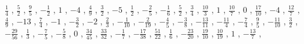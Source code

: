 \documentclass[12pt,fleqn]{article}
\theoremstyle{aufg}
\theoremstyle{bsp}
\begin{document}
\begin{flushleft}
$ \scriptstyle\frac{1}{4}$ , $ \scriptstyle\frac{5}{2}$ , $ \scriptstyle\frac{9}{5}$ , $ \scriptstyle- \frac{1}{2}$ , $ \scriptstyle1$ , $ \scriptstyle-4$ , $ \scriptstyle\frac{4}{9}$ , $ \scriptstyle\frac{3}{2}$ , $ \scriptstyle-5$ , $ \scriptstyle\frac{1}{2}$ , $ \scriptstyle- \frac{2}{5}$ , $ \scriptstyle- \frac{1}{6}$ , $ \scriptstyle\frac{5}{2}$ , $ \scriptstyle\frac{3}{4}$ , $ \scriptstyle\frac{10}{3}$ , $ \scriptstyle1$ , $ \scriptstyle\frac{10}{7}$ , $ \scriptstyle0$ , $ \scriptstyle\frac{17}{10}$ , $ \scriptstyle-4$ , $ \scriptstyle\frac{12}{7}$ , $ \scriptstyle\frac{4}{9}$ , $ \scriptstyle-13$ , $ \scriptstyle\frac{7}{4}$ , $ \scriptstyle-1$ , $ \scriptstyle- \frac{3}{2}$ , $ \scriptstyle-2$ , $ \scriptstyle\frac{2}{3}$ , $ \scriptstyle- \frac{1}{10}$ , $ \scriptstyle- \frac{2}{19}$ , $ \scriptstyle- \frac{4}{5}$ , $ \scriptstyle- \frac{3}{8}$ , $ \scriptstyle- \frac{13}{11}$ , $ \scriptstyle- \frac{11}{4}$ , $ \scriptstyle- \frac{7}{4}$ , $ \scriptstyle\frac{9}{5}$ , $ \scriptstyle- \frac{11}{10}$ , $ \scriptstyle\frac{3}{2}$ , $ \scriptstyle- \frac{29}{56}$ , $ \scriptstyle\frac{1}{3}$ , $ \scriptstyle- \frac{7}{5}$ , $ \scriptstyle- \frac{5}{8}$ , $ \scriptstyle0$ , $ \scriptstyle\frac{34}{45}$ , $ \scriptstyle\frac{33}{32}$ , $ \scriptstyle- \frac{1}{7}$ , $ \scriptstyle- \frac{17}{38}$ , $ \scriptstyle\frac{51}{22}$ , $ \scriptstyle\frac{1}{6}$ , $ \scriptstyle- \frac{23}{20}$ , $ \scriptstyle\frac{19}{10}$ , $ \scriptstyle\frac{10}{19}$ , $ \scriptstyle1$ , $ \scriptstyle- \frac{13}{7}$ , \end{flushleft} 
\end{document}
